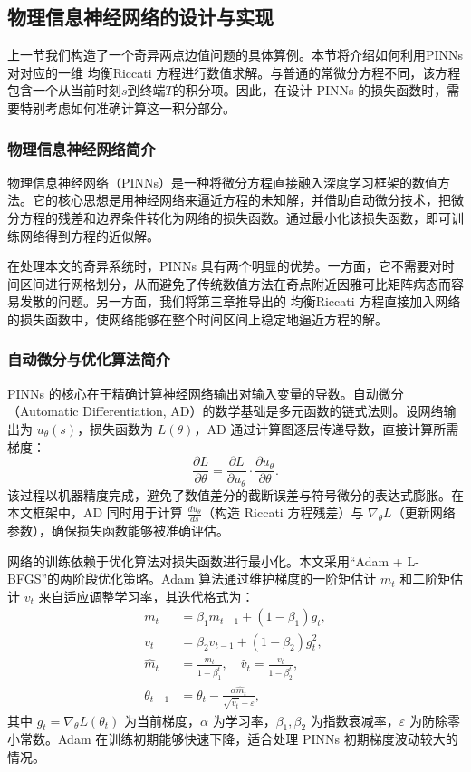 \documentclass{GZUbachelorthesis}
\begin{document}
\subsection{物理信息神经网络的设计与实现}
上一节我们构造了一个奇异两点边值问题的具体算例。本节将介绍如何利用PINNs对对应的一维 均衡Riccati 方程进行数值求解。与普通的常微分方程不同，该方程包含一个从当前时刻$s$到终端$T$的积分项。因此，在设计 PINNs 的损失函数时，需要特别考虑如何准确计算这一积分部分。

\subsubsection{物理信息神经网络简介}

物理信息神经网络（PINNs）是一种将微分方程直接融入深度学习框架的数值方法。它的核心思想是用神经网络来逼近方程的未知解，并借助自动微分技术，把微分方程的残差和边界条件转化为网络的损失函数。通过最小化该损失函数，即可训练网络得到方程的近似解。

在处理本文的奇异系统时，PINNs 具有两个明显的优势。一方面，它不需要对时间区间进行网格划分，从而避免了传统数值方法在奇点附近因雅可比矩阵病态而容易发散的问题。另一方面，我们将第三章推导出的 均衡Riccati 方程直接加入网络的损失函数中，使网络能够在整个时间区间上稳定地逼近方程的解。

\subsubsection{自动微分与优化算法简介}
PINNs 的核心在于精确计算神经网络输出对输入变量的导数。自动微分（Automatic Differentiation, AD）的数学基础是多元函数的链式法则。设网络输出为 $u_\theta(s)$，损失函数为 $L(\theta)$，AD 通过计算图逐层传递导数，直接计算所需梯度：
\begin{equation}
	\frac{\partial L}{\partial \theta} = \frac{\partial L}{\partial u_\theta} \cdot \frac{\partial u_\theta}{\partial \theta}.
\end{equation}
该过程以机器精度完成，避免了数值差分的截断误差与符号微分的表达式膨胀。在本文框架中，AD 同时用于计算 $\frac{d u_\theta}{d s}$（构造 Riccati 方程残差）与 $\nabla_\theta L$（更新网络参数），确保损失函数能够被准确评估。

网络的训练依赖于优化算法对损失函数进行最小化。本文采用“Adam + L-BFGS”的两阶段优化策略。Adam 算法通过维护梯度的一阶矩估计 $m_t$ 和二阶矩估计 $v_t$ 来自适应调整学习率，其迭代格式为：
\begin{equation}
	\begin{aligned}
		m_t &= \beta_1 m_{t-1} + (1-\beta_1) g_t, \\
		v_t &= \beta_2 v_{t-1} + (1-\beta_2) g_t^2, \\
		\hat{m}_t &= \frac{m_t}{1-\beta_1^t}, \quad \hat{v}_t = \frac{v_t}{1-\beta_2^t}, \\
		\theta_{t+1} &= \theta_t - \frac{\alpha \hat{m}_t}{\sqrt{\hat{v}_t} + \varepsilon},
	\end{aligned}
\end{equation}
其中 $g_t = \nabla_\theta L(\theta_t)$ 为当前梯度，$\alpha$ 为学习率，$\beta_1, \beta_2$ 为指数衰减率，$\varepsilon$ 为防除零小常数。Adam 在训练初期能够快速下降，适合处理 PINNs 初期梯度波动较大的情况。
\end{document}
